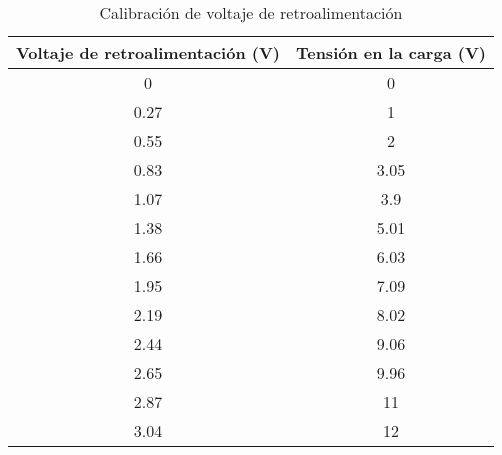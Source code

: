 \begin{table}[H]
    \centering
    \begin{tabular}{|c|c|}
    \hline
    Voltaje de retroalimentación (V) & Tensión en la carga (V) \\ \hline
    0                                & 0                       \\
    0.27                             & 1                       \\
    0.55                             & 2                       \\
    0.83                             & 3.05                    \\
    1.07                             & 3.9                     \\
    1.38                             & 5.01                    \\
    1.66                             & 6.03                    \\
    1.95                             & 7.09                    \\
    2.19                             & 8.02                    \\
    2.44                             & 9.06                    \\
    2.65                             & 9.96                    \\
    2.87                             & 11                      \\
    3.04                             & 12                      \\ \hline
    \end{tabular}
    \label{tab:calibración_fb}
    \vspace{-0.25cm}
    \caption{Calibración de voltaje de retroalimentación}
\end{table}